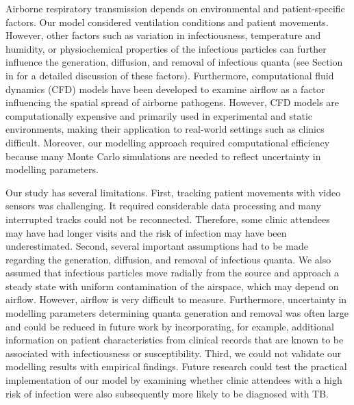 \documentclass[fleqn,11pt]{wlscirep}
\begin{document}
Airborne respiratory transmission depends on environmental and patient-specific factors. Our model considered ventilation conditions and patient movements. However, other factors such as variation in infectiousness, temperature and humidity, or physiochemical properties of the infectious particles can further influence the generation, diffusion, and removal of infectious quanta (see Section~ in \supp for a detailed discussion of these factors). Furthermore, computational fluid dynamics (CFD) models have been developed to examine airflow as a factor influencing the spatial spread of airborne pathogens\cite{Vuorinen2020SafSci,Jung2021InfectChemo,Li2021BuildEnv,Yan2023BE,Qian2009BE,Li2022SOTTE}. However, CFD models are computationally expensive and primarily used in experimental and static environments, making their application to real-world settings such as clinics difficult. Moreover, our modelling approach required computational efficiency because many Monte Carlo simulations are needed to reflect uncertainty in modelling parameters. 

Our study has several limitations. First, tracking patient movements with video sensors was challenging. It required considerable data processing and many interrupted tracks could not be reconnected. Therefore, some clinic attendees may have had longer visits and the risk of infection may have been underestimated. Second, several important assumptions had to be made regarding the generation, diffusion, and removal of infectious quanta.  We also assumed that infectious particles move radially from the source and approach a steady state with uniform contamination of the airspace, which may depend on airflow. However, airflow is very difficult to measure. Furthermore, uncertainty in modelling parameters determining quanta generation and removal was often large and could be reduced in future work by incorporating, for example, additional information on patient characteristics from clinical records that are known to be associated with infectiousness\cite{Escombe2008PLoSMed} or susceptibility\cite{Furin2019Lancet}. Third, we could not validate our modelling results with empirical findings. Future research could test the practical implementation of our model by examining whether clinic attendees with a high risk of infection were also subsequently more likely to be diagnosed with TB.  
\end{document}
